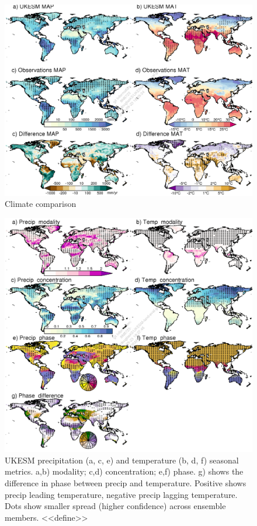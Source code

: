 \documentclass[bg, manuscript]{copernicus}
\begin{document}
\begin{figure}[t]
    \includegraphics[width=12cm]{figs/Climate/annual_average_clims.png}
    \caption{Climate comparison \label{fig:ClimateAAMaps}}
\end{figure}

\begin{figure}[t]
    \includegraphics[width=12cm]{figs/Climate/climStuff-UKESM.png}
    \caption{UKESM precipitation (a, c, e) and temperature (b, d, f) seasonal metrics. a,b) modality; c,d) concentration; e,f) phase. g) shows the difference in phase between precip and temperature. Positive shows precip leading temperature, negative precip lagging temperature. Dots show smaller spread (higher confidence) across ensemble members. <<define>>  \label{fig:ClimateSeasonUKESMmaps}}
\end{figure}
\end{document}
